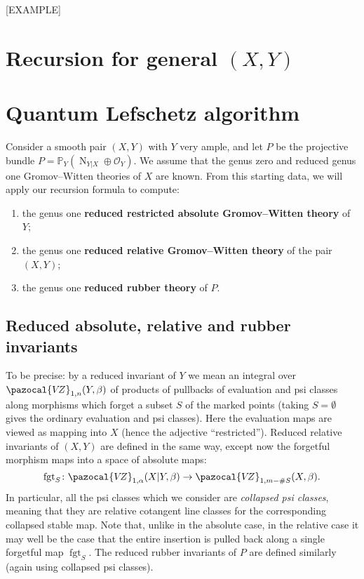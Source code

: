 \documentclass[11pt]{amsart}
\newcommand{\PP}{\mathbb P}
\newcommand{\VZ}{\pazocal{V\!Z}}
\newcommand{\OO}{\mathcal{O}}
\renewcommand{\to}{\rightarrow}
\newcommand{\fgt}{\operatorname{fgt}}
\theoremstyle{definition}
\theoremstyle{definition}
\begin{document}
[EXAMPLE]



\section{Recursion for general $(X,Y)$}\label{section recursion for general pair}

\section{Quantum Lefschetz algorithm}\label{section recursion algorithm}
Consider a smooth pair $(X,Y)$ with $Y$ very ample, and let $P$ be the projective bundle $P=\PP_Y(\operatorname{N}_{Y|X} \oplus\OO_Y)$. We assume that the genus zero and reduced genus one Gromov--Witten theories of $X$ are known. From this starting data, we will apply our recursion formula to compute:
\begin{enumerate}
\item the genus one \textbf{reduced restricted absolute Gromov--Witten theory} of $Y$;
\item the genus one \textbf{reduced relative Gromov--Witten theory} of the pair $(X,Y)$;
\item the genus one \textbf{reduced rubber theory} of $P$.
\end{enumerate}

\subsection{Reduced absolute, relative and rubber invariants} To be precise: by a reduced invariant of $Y$ we mean an integral over $\VZ_{1,n}(Y,\beta)$ of products of pullbacks of evaluation and psi classes along morphisms which forget a subset $S$ of the marked points (taking $S=\emptyset$ gives the ordinary evaluation and psi classes). Here the evaluation maps are viewed as mapping into $X$ (hence the adjective ``restricted''). Reduced relative invariants of $(X,Y)$ are defined in the same way, except now the forgetful morphism maps into a space of absolute maps:
\begin{equation*} \fgt_S \colon \VZ_{1,\alpha}(X|Y,\beta) \to \VZ_{1,m-\#S}(X,\beta).\end{equation*}
In particular, all the psi classes which we consider are \emph{collapsed psi classes}, meaning that they are relative cotangent line classes for the corresponding collapsed stable map. Note that, unlike in the absolute case, in the relative case it may well be the case that the entire insertion is pulled back along a single forgetful map $\fgt_S$. The reduced rubber invariants of $P$ are defined similarly (again using collapsed psi classes).
\end{document}

